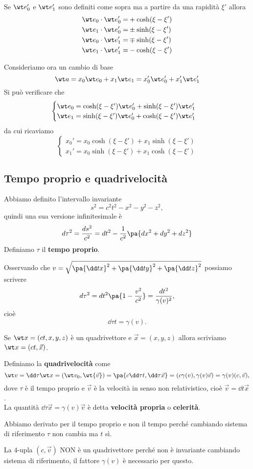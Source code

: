 \noindent
Se $\wt e_0'$ e $\wt e_1'$ sono definiti come sopra ma a partire da una rapidit\`a $\xi'$ allora
\begin{align*}
\wt e_0\cdot \wt e_0'=&+\cosh(\xi-\xi')\\
\wt e_1\cdot \wt e_0'=&\pm \sinh(\xi-\xi')\\
\wt e_0\cdot \wt e_1'=&\mp\sinh(\xi-\xi')\\
\wt e_1\cdot \wt e_1'=&-\cosh(\xi-\xi')
\end{align*}

\noindent
Consideriamo ora un cambio di base
\[\wt a=x_0\wt e_0+x_1\wt e_1=x_0'\wt e_0'+x_1'\wt e_1'\]
Si pu\`o verificare che
\[\begin{cases}
\wt e_0=\cosh(\xi-\xi')\wt e_0'+\sinh(\xi-\xi')\wt e_1'\\
\wt e_1=\sinh(\xi-\xi')\wt e_0'+\cosh(\xi-\xi')\wt e_1'
\end{cases}\]
da cui ricaviamo
\[\begin{cases}
x_0'=x_0\cosh(\xi-\xi')+x_1\sinh(\xi-\xi')\\
x_1'=x_0\sinh(\xi-\xi')+x_1\cosh(\xi-\xi')
\end{cases}\]

\subsection{Tempo proprio e quadrivelocit\`a}
Abbiamo definito l'intervallo invariante
\[s^2=c^2t^2-x^2-y^2-z^2,\]
quindi una sua versione infinitesimale \`e
\[d\tau^2=\frac{ds^2}{c^2}=dt^2-\frac1{c^2}\pa{dx^2+dy^2+dz^2}\]
Definiamo $\tau$ il \textbf{tempo proprio}.
\bigskip

\noindent Osservando che $v=\sqrt{\pa{\dd tx}^2+\pa{\dd ty}^2+\pa{\dd tz}^2}$ possiamo scrivere
\[d\tau^2=dt^2\pa{1-\frac{v^2}{c^2}}=\frac{dt^2}{\gamma(v)^2},\]
cio\`e
\[\dd \tau t=\gamma(v).\]

\begin{notation}
Se $\wt x=(ct,x,y,z)$ \`e un quadrivettore e $\vec x=(x,y,z)$ allora scriviamo $\wt x=(ct,\vec x)$.
\end{notation}

\begin{definition}[Quadrivelocit\`a]
Definiamo la \textbf{quadrivelocit\`a} come
\[\wt v=\dd \tau{\wt x}=(\wt v_0,\wt{\vec v})=\pa{c\dd \tau t,\dd \tau{\vec x}}=(c\gamma(v),\gamma(v)\vec v)=\gamma(v)(c,\vec v),\]
dove $\tau$ \`e il tempo proprio e $\vec v$ \`e la velocit\`a in senso non relativistico, cio\`e $\vec v=\dd t{\vec x}$.\\
La quantit\`a $\dd \tau{\vec x}=\gamma(v)\vec v$ \`e detta \textbf{velocit\`a propria} o \textbf{celerit\`a}.
\end{definition}
\begin{remark}
Abbiamo derivato per il tempo proprio e non il tempo perch\'e cambiando sistema di riferimento $\tau$ non cambia ma $t$ s\`i.
\end{remark}
\begin{remark}
La $4$-upla $(c,\vec v)$ NON \`e un quadrivettore perch\'e non \`e invariante cambiando sistema di riferimento, il fattore $\gamma(v)$ \`e necessario per questo.
\end{remark}

